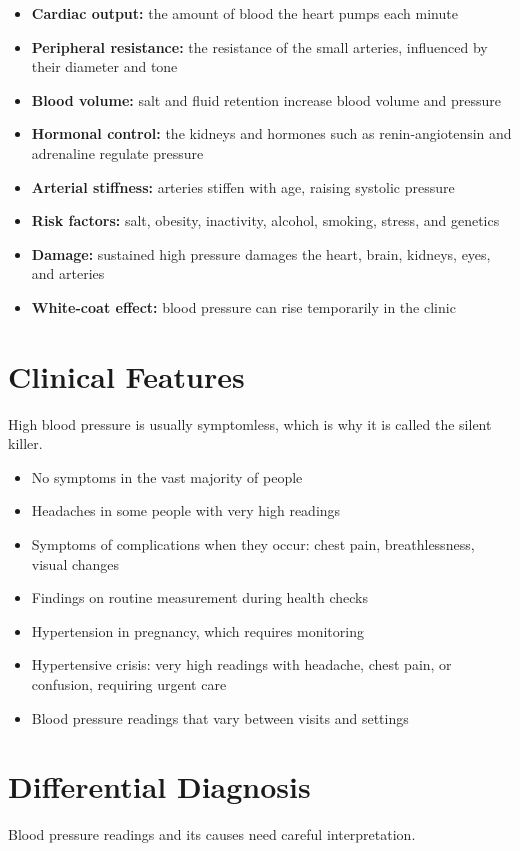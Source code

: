 \begin{itemize}
    \item \textbf{Cardiac output:} the amount of blood the heart pumps each minute
    \item \textbf{Peripheral resistance:} the resistance of the small arteries, influenced by their diameter and tone
    \item \textbf{Blood volume:} salt and fluid retention increase blood volume and pressure
    \item \textbf{Hormonal control:} the kidneys and hormones such as renin-angiotensin and adrenaline regulate pressure
    \item \textbf{Arterial stiffness:} arteries stiffen with age, raising systolic pressure
    \item \textbf{Risk factors:} salt, obesity, inactivity, alcohol, smoking, stress, and genetics
    \item \textbf{Damage:} sustained high pressure damages the heart, brain, kidneys, eyes, and arteries
    \item \textbf{White-coat effect:} blood pressure can rise temporarily in the clinic
\end{itemize}

\section*{Clinical Features}
High blood pressure is usually symptomless, which is why it is called the silent killer.

\begin{itemize}
    \item No symptoms in the vast majority of people
    \item Headaches in some people with very high readings
    \item Symptoms of complications when they occur: chest pain, breathlessness, visual changes
    \item Findings on routine measurement during health checks
    \item Hypertension in pregnancy, which requires monitoring
    \item Hypertensive crisis: very high readings with headache, chest pain, or confusion, requiring urgent care
    \item Blood pressure readings that vary between visits and settings
\end{itemize}

\section*{Differential Diagnosis}
Blood pressure readings and its causes need careful interpretation.

